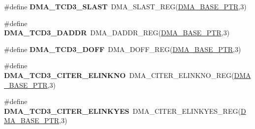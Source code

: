 \begin{DoxyCompactItemize}
\item 
\hypertarget{group___d_m_a___register___accessor___macros_gae3a5b45233b7f24c770759413cbbb8bd}{}\#define {\bfseries D\+M\+A\+\_\+\+T\+C\+D3\+\_\+\+S\+L\+A\+S\+T}~D\+M\+A\+\_\+\+S\+L\+A\+S\+T\+\_\+\+R\+E\+G(\hyperlink{group___d_m_a___peripheral_ga6997fbc1b1973e9f27170217a3bd6f22}{D\+M\+A\+\_\+\+B\+A\+S\+E\+\_\+\+P\+T\+R},3)\label{group___d_m_a___register___accessor___macros_gae3a5b45233b7f24c770759413cbbb8bd}

\item 
\hypertarget{group___d_m_a___register___accessor___macros_ga00d0aa21f0dc3f9be0643931ee4af148}{}\#define {\bfseries D\+M\+A\+\_\+\+T\+C\+D3\+\_\+\+D\+A\+D\+D\+R}~D\+M\+A\+\_\+\+D\+A\+D\+D\+R\+\_\+\+R\+E\+G(\hyperlink{group___d_m_a___peripheral_ga6997fbc1b1973e9f27170217a3bd6f22}{D\+M\+A\+\_\+\+B\+A\+S\+E\+\_\+\+P\+T\+R},3)\label{group___d_m_a___register___accessor___macros_ga00d0aa21f0dc3f9be0643931ee4af148}

\item 
\hypertarget{group___d_m_a___register___accessor___macros_ga20dd71cc6246dba8d54263a5244d8462}{}\#define {\bfseries D\+M\+A\+\_\+\+T\+C\+D3\+\_\+\+D\+O\+F\+F}~D\+M\+A\+\_\+\+D\+O\+F\+F\+\_\+\+R\+E\+G(\hyperlink{group___d_m_a___peripheral_ga6997fbc1b1973e9f27170217a3bd6f22}{D\+M\+A\+\_\+\+B\+A\+S\+E\+\_\+\+P\+T\+R},3)\label{group___d_m_a___register___accessor___macros_ga20dd71cc6246dba8d54263a5244d8462}

\item 
\hypertarget{group___d_m_a___register___accessor___macros_gac7f6258ced19b6d5b2589bb46ab8014d}{}\#define {\bfseries D\+M\+A\+\_\+\+T\+C\+D3\+\_\+\+C\+I\+T\+E\+R\+\_\+\+E\+L\+I\+N\+K\+N\+O}~D\+M\+A\+\_\+\+C\+I\+T\+E\+R\+\_\+\+E\+L\+I\+N\+K\+N\+O\+\_\+\+R\+E\+G(\hyperlink{group___d_m_a___peripheral_ga6997fbc1b1973e9f27170217a3bd6f22}{D\+M\+A\+\_\+\+B\+A\+S\+E\+\_\+\+P\+T\+R},3)\label{group___d_m_a___register___accessor___macros_gac7f6258ced19b6d5b2589bb46ab8014d}

\item 
\hypertarget{group___d_m_a___register___accessor___macros_ga4a8907e1cd9237bc52b3f58c16389781}{}\#define {\bfseries D\+M\+A\+\_\+\+T\+C\+D3\+\_\+\+C\+I\+T\+E\+R\+\_\+\+E\+L\+I\+N\+K\+Y\+E\+S}~D\+M\+A\+\_\+\+C\+I\+T\+E\+R\+\_\+\+E\+L\+I\+N\+K\+Y\+E\+S\+\_\+\+R\+E\+G(\hyperlink{group___d_m_a___peripheral_ga6997fbc1b1973e9f27170217a3bd6f22}{D\+M\+A\+\_\+\+B\+A\+S\+E\+\_\+\+P\+T\+R},3)\label{group___d_m_a___register___accessor___macros_ga4a8907e1cd9237bc52b3f58c16389781}


\end{DoxyCompactItemize}
